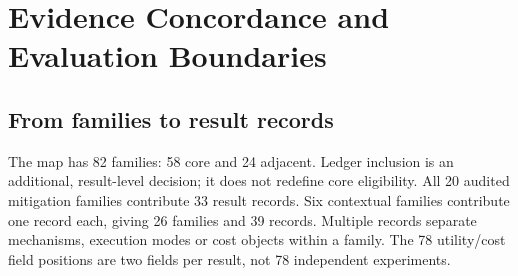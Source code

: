 \section{Evidence Concordance and Evaluation Boundaries}\label{app:concordance}
\subsection{From families to result records}
The map has 82 families: 58 core and 24 adjacent. Ledger inclusion is an additional, result-level decision; it does not redefine core eligibility. All 20 audited mitigation families contribute 33 result records. Six contextual families contribute one record each, giving 26 families and 39 records. Multiple records separate mechanisms, execution modes or cost objects within a family. The 78 utility/cost field positions are two fields per result, not 78 independent experiments.

